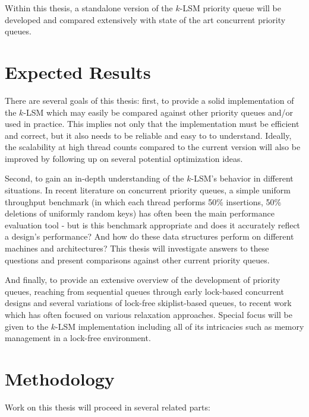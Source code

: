 \documentclass[a4paper,10pt]{article}
\begin{document}
Within this thesis, a standalone version of the $k$-LSM priority queue will be
developed and compared extensively with state of the art concurrent priority
queues.

\section{Expected Results}

There are several goals of this thesis: first, to provide a solid
implementation of the $k$-LSM which may easily be compared against other
priority queues and/or used in practice. This implies not only that the
implementation must be efficient and correct, but it also needs to be reliable
and easy to to understand. Ideally, the scalability at high thread counts
compared to the current version will also be improved by following up on
several potential optimization ideas.

Second, to gain an in-depth understanding of the $k$-LSM's behavior in
different situations. In recent literature on concurrent priority queues, a
simple uniform throughput benchmark (in which each thread performs 50\%
insertions, 50\% deletions of uniformly random keys) has often been the main
performance evaluation tool - but is this benchmark appropriate and does it
accurately reflect a design's performance? And how do these data structures
perform on different machines and architectures? This thesis will investigate
answers to these questions and present comparisons against other current
priority queues.

And finally, to provide an extensive overview of the development of priority
queues, reaching from sequential queues through early lock-based concurrent
designs and several variations of lock-free skiplist-based queues, to recent
work which has often focused on various relaxation approaches. Special focus
will be given to the $k$-LSM implementation including all of its intricacies
such as memory management in a lock-free environment.

\section{Methodology}

Work on this thesis will proceed in several related parts:
\end{document}
